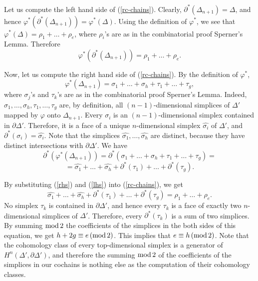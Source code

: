 \documentclass[leqno, 11pt]{article}\usepackage{latexsym}\usepackage{amsmath, amscd}\usepackage{amssymb}
\begin{document}
Let us compute the left hand side of (\ref{rc-chains}). Clearly,  $\partial^*(\Delta_{n+1})=\Delta$, and hence $\varphi^*(\partial^*(\Delta_{n+1}))=\varphi^*(\Delta)$. 
Using the definition of $\varphi^*$, we see that $\varphi^*(\Delta)=\rho_1+\ldots+\rho_e$, where $\rho_i$'s are as in the combinatorial proof Sperner's Lemma. 
Therefore
\begin{equation}
\label{rhs}
\varphi^*(\partial^*(\Delta_{n+1}))=\rho_1+\ldots+\rho_e.
\end{equation}

Now, let us compute the right hand side of (\ref{rc-chains}). By the definition of $\varphi^*$,
\[
\varphi^*(\Delta_{n+1})= \sigma_1+\ldots+\sigma_h+\tau_1+\ldots+\tau_g,
\]
where $\sigma_j$'s and $\tau_k$'s are as in the combinatorial proof Sperner's Lemma. Indeed,
$\sigma_1,\ldots,\sigma_h,\tau_1,\ldots,\tau_g$ are, by definition, all $(n-1)$-dimensional simplices of $\Delta'$ mapped by $\varphi$ onto $\Delta_{n+1}$.
Every $\sigma_i$ is an $(n-1)$-dimensional simplex contained in $\partial\Delta'$. Therefore, it is a face of a unique $n$-dimensional simplex $\widehat{\sigma_i}$ of $\Delta'$, and $\partial^*(\sigma_i)= \widehat{\sigma_i}$. 
Note that the simplices $\widehat{\sigma_1},\ldots,\widehat{\sigma_h}$ are distinct, because they have distinct intersections with  $\partial\Delta'$.
We have
\begin{equation}
\label{lhs}
\partial^*(\varphi^*(\Delta_{n+1}))=\partial^*(\sigma_1+\ldots+\sigma_h+\tau_1+\ldots+\tau_g)=
\end{equation}
\[=
\widehat{\sigma_1}+\ldots+\widehat{\sigma_h}+\partial^*(\tau_1)+\ldots+\partial^*(\tau_g).
\]

By substituting (\ref{rhs}) and (\ref{lhs}) into (\ref{rc-chains}), we get
\begin{equation}
\label{chain}
\widehat{\sigma_1}+\ldots+\widehat{\sigma_h}+\partial^*(\tau_1)+\ldots+\partial^*(\tau_g)=\rho_1+\ldots+\rho_e.
\end{equation}
No simplex $\tau_k$ is contained in $\partial\Delta'$, and hence every $\tau_k$
is a face of exactly two $n$-dimensional simplices of $\Delta'$. 
Therefore, every $\partial^*(\tau_k)$ is a sum of two simplices. 
By summing ${\rm mod}\, 2$ the coefficients of the simplices in the both sides of this equation, we get $h+2g \equiv e\, ({\rm mod}\, 2)$. This implies that 
$e\equiv h\, ({\rm mod}\, 2)$. Note that the cohomology class of every top-dimensional simplex is a generator of $H^n(\Delta',\partial\Delta')$, and therefore
the summing ${\rm mod}\, 2$ of the coefficients of the simplices in our cochains is nothing else as the computation of their cohomology classes. 
\end{document}
